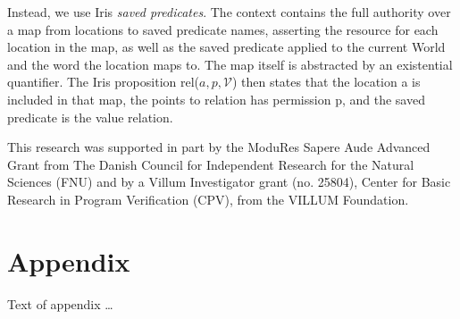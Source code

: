 \documentclass[sigplan,review]{acmart}\settopmatter{printfolios=true,printccs=false,printacmref=false}
\begin{document}
Instead, we use Iris \textit{saved predicates}. The context contains the full authority over a map from locations to saved predicate names, asserting the resource for each location in the map, as well as the saved predicate applied to the current World and the word the location maps to. The map itself is abstracted by an existential quantifier. The Iris proposition rel($a,p,\mathcal{V}$) then states that the location a is included in that map, the points to relation has permission p, and the saved predicate is the value relation.
\newpage
\begin{acks}                            %

  This research was supported in part by the ModuRes Sapere Aude Advanced Grant from The Danish Council for Independent Research for the Natural Sciences (FNU) and by a Villum Investigator grant (no.
  25804), Center for Basic Research in Program Verification (CPV), from the VILLUM Foundation.
  
\end{acks}





\appendix
\section{Appendix}

Text of appendix \ldots
\end{document}
